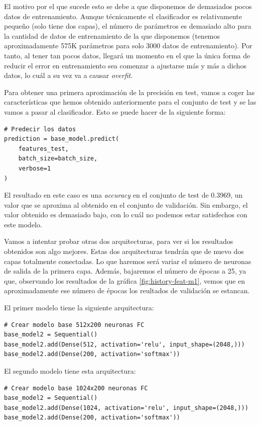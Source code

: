 \documentclass[11pt,a4paper]{article}
\begin{document}
El motivo por el que sucede esto se debe a que disponemos de demasiados pocos datos de
entrenamiento. Aunque técnicamente el clasificador es relativamente pequeño (solo
tiene dos capas), el número de parámetros es demasiado alto para la cantidad de datos
de entrenamiento de la que disponemos (tenemos aproximadamente 575K parámetros para
solo 3000 datos de entrenamiento). Por tanto, al tener tan pocos datos, llegará un
momento en el que la única forma de reducir el error en entrenamiento sea comenzar
a ajustarse más y más a dichos datos, lo cuál a su vez va a causar \textit{overfit}.

Para obtener una primera aproximación de la precisión en test, vamos a coger las
características que hemos obtenido anteriormente para el conjunto de test y se las
vamos a pasar al clasificador. Esto se puede hacer de la siguiente forma:

\begin{lstlisting}
# Predecir los datos
prediction = base_model.predict(
    features_test,
    batch_size=batch_size,
    verbose=1
)
\end{lstlisting}

El resultado en este caso es una \textit{accuracy} en el conjunto de test
de 0.3969, un valor que se aproxima al obtenido en el conjunto de validación. Sin embargo,
el valor obtenido es demasiado bajo, con lo cuál no podemos estar satisfechos con este modelo.

Vamos a intentar probar otras dos arquitecturas, para ver si los resultados obtenidos son algo
mejores. Estas dos arquitecturas tendrán que de nuevo dos capas totalmente conectadas.
Lo que haremos será variar el número de neuronas de salida de la primera capa. Además, bajaremos
el número de épocas a 25, ya que, observando los resultados de la gráfica \ref{fig:history-feat-m1},
vemos que en aproximadamente ese número de épocas los reultados de validación se estancan.

El primer modelo tiene la siguiente arquitectura:

\begin{lstlisting}
# Crear modelo base 512x200 neuronas FC
base_model2 = Sequential()
base_model2.add(Dense(512, activation='relu', input_shape=(2048,)))
base_model2.add(Dense(200, activation='softmax'))
\end{lstlisting}

El segundo modelo tiene esta arquitectura:

\begin{lstlisting}
# Crear modelo base 1024x200 neuronas FC
base_model2 = Sequential()
base_model2.add(Dense(1024, activation='relu', input_shape=(2048,)))
base_model2.add(Dense(200, activation='softmax'))
\end{lstlisting}
\end{document}
